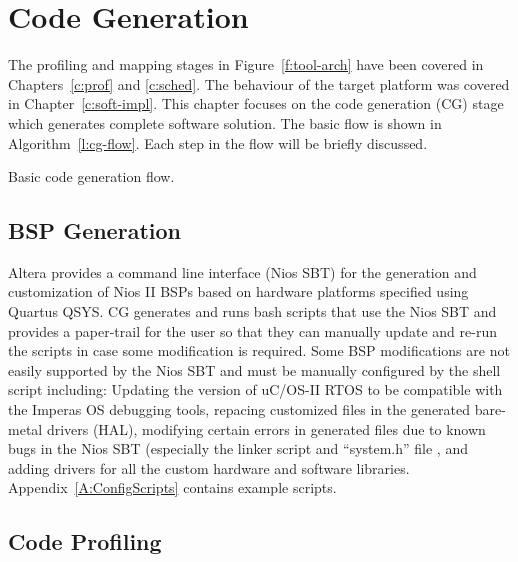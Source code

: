 
\chapter{Code Generation} %
\label{c:code-gen}

	The profiling and mapping stages in Figure~\ref{f:tool-arch} have been covered in Chapters~\ref{c:prof} and \ref{c:sched}. 
	The behaviour of the target platform was covered in Chapter~\ref{c:soft-impl}. 
	This chapter focuses on the code generation (CG) stage which generates complete software solution. The basic flow is shown in Algorithm~\ref{l:cg-flow}. Each step in the flow will be briefly discussed.
	
	
\begin{algorithm}

\caption{Basic code generation flow.}
\label{l:cg-flow}
\end{algorithm}

\section{BSP Generation}
	Altera provides a command line interface (Nios SBT) for the generation and customization of Nios II BSPs based on hardware platforms specified using Quartus QSYS. 
	CG generates and runs bash scripts that use the Nios SBT and provides a paper-trail for the user so that they can manually update and re-run the scripts in case some modification is required.
	Some BSP modifications are not easily supported by the Nios SBT and must be manually configured by the shell script including: Updating the version of uC/OS-II RTOS to be compatible with the Imperas OS debugging tools, repacing customized files in the generated bare-metal drivers (HAL), modifying certain errors in generated files due to known bugs in the Nios SBT (especially the linker script and ``system.h'' file , and adding drivers for all the custom hardware and software libraries. Appendix~\ref{A:ConfigScripts} contains example scripts.

\section{Code Profiling}

